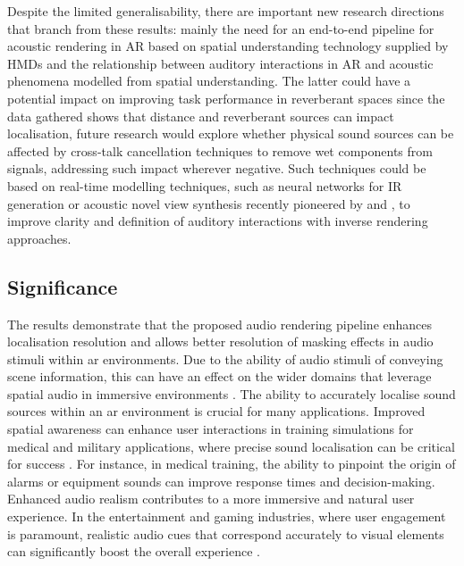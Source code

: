Despite the limited generalisability, there are important new research directions that branch from these results: mainly the need for an end-to-end pipeline for acoustic rendering in AR based on spatial understanding technology supplied by HMDs and the relationship between auditory interactions in AR and acoustic phenomena modelled from spatial understanding. The latter could have a potential impact on improving task performance in reverberant spaces since the data gathered shows that distance and reverberant sources can impact localisation, future research would explore whether physical sound sources can be affected by cross-talk cancellation techniques to remove wet components from signals, addressing such impact wherever negative. Such techniques could be based on real-time modelling techniques, such as neural networks for IR generation or acoustic novel view synthesis recently pioneered by \cite{ratnarajah2022mesh2ir} and  \cite{chen2023novel}, to improve clarity and definition of auditory interactions with inverse rendering approaches. \par

\subsection{Significance}
The results demonstrate that the proposed audio rendering pipeline enhances localisation resolution and allows better resolution of masking effects in audio stimuli within \acrshort{ar} environments. Due to the ability of audio stimuli of conveying scene information, this can have an effect on the wider domains that leverage spatial audio in immersive environments \citep{yang2022audio}. 
The ability to accurately localise sound sources within an \acrshort{ar} environment is crucial for many applications. Improved spatial awareness can enhance user interactions in training simulations for medical and military applications, where precise sound localisation can be critical for success \citep{vine2023training}. For instance, in medical training, the ability to pinpoint the origin of alarms or equipment sounds can improve response times and decision-making. Enhanced audio realism contributes to a more immersive and natural user experience. In the entertainment and gaming industries, where user engagement is paramount, realistic audio cues that correspond accurately to visual elements can significantly boost the overall experience \citep{slater2009visual}.


